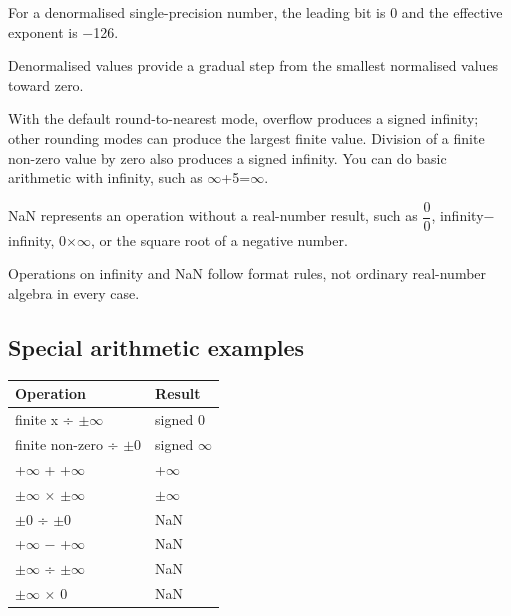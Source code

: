 \documentclass[11pt]{article}
\begin{document}
\begin{keepsection}
For a denormalised single-precision number, the leading bit is 0 and the effective exponent is \ensuremath{-}126.

Denormalised values provide a gradual step from the smallest normalised values toward zero.

With the default round-to-nearest mode, overflow produces a signed infinity; other rounding modes can produce the largest finite value. Division of a finite non-zero value by zero also produces a signed infinity. You can do basic arithmetic with infinity, such as \ensuremath{\infty}+5=\ensuremath{\infty}.

NaN represents an operation without a real-number result, such as {\small\ensuremath{\dfrac{0}{0}}}, infinity\ensuremath{-}infinity, 0\ensuremath{\times}\ensuremath{\infty}, or the square root of a negative number.

Operations on infinity and NaN follow format rules, not ordinary real-number algebra in every case.

\begin{keepsection}
\subsection{Special arithmetic examples}

\begin{center}\small\begin{tabularx}{\linewidth}{>{\raggedright\arraybackslash}X>{\raggedright\arraybackslash}X}\toprule
\textbf{Operation} & \textbf{Result} \\ \midrule
finite x ÷ \ensuremath{\pm}\ensuremath{\infty} & signed 0 \\
finite non-zero ÷ \ensuremath{\pm}0 & signed \ensuremath{\infty} \\
+\ensuremath{\infty} + +\ensuremath{\infty} & +\ensuremath{\infty} \\
\ensuremath{\pm}\ensuremath{\infty} \ensuremath{\times} \ensuremath{\pm}\ensuremath{\infty} & \ensuremath{\pm}\ensuremath{\infty} \\
\ensuremath{\pm}0 ÷ \ensuremath{\pm}0 & NaN \\
+\ensuremath{\infty} \ensuremath{-} +\ensuremath{\infty} & NaN \\
\ensuremath{\pm}\ensuremath{\infty} ÷ \ensuremath{\pm}\ensuremath{\infty} & NaN \\
\ensuremath{\pm}\ensuremath{\infty} \ensuremath{\times} 0 & NaN \\
\bottomrule\end{tabularx}\end{center}


\end{keepsection}
\end{keepsection}
\end{document}

